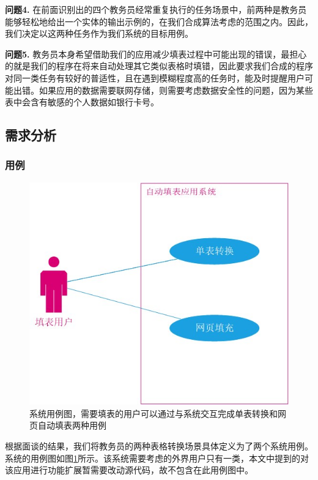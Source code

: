 \documentclass[design, pageheader]{njubachelor}
\begin{document}
{\bfseries 问题4.} 在前面识别出的四个教务员经常重复执行的任务场景中，前两种是教务员能够轻松地给出一个实体的输出示例的，在我们合成算法考虑的范围之内。因此，我们决定以这两种任务作为我们系统的目标用例。

{\bfseries 问题5.} 教务员本身希望借助我们的应用减少填表过程中可能出现的错误，最担心的就是我们的程序在将来自动处理其它类似表格时填错，因此要求我们合成的程序对同一类任务有较好的普适性，且在遇到模糊程度高的任务时，能及时提醒用户可能出错。如果应用的数据需要联网存储，则需要考虑数据安全性的问题，因为某些表中会含有敏感的个人数据如银行卡号。

\subsection{需求分析}
\subsubsection{用例}

\begin{figure}
    \includegraphics{figures/use_case.jpg}
    \caption{系统用例图，需要填表的用户可以通过与系统交互完成单表转换和网页自动填表两种用例}
    \label{fig:use_case}
\end{figure}

根据面谈的结果，我们将教务员的两种表格转换场景具体定义为了两个系统用例。系统的用例图如图\ref{fig:use_case}所示。该系统需要考虑的外界用户只有一类，本文中提到的对该应用进行功能扩展暂需要改动源代码，故不包含在此用例图中。
\end{document}

